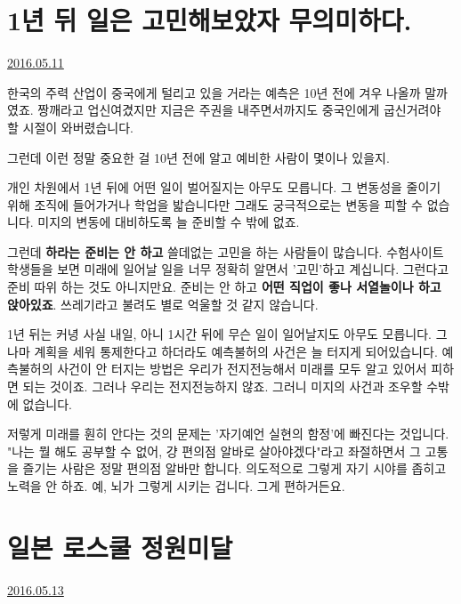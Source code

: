 \section{1년 뒤 일은 고민해보았자 무의미하다.}
\href{https://www.kockoc.com/Apoc/769099}{2016.05.11}

\vspace{5mm}

한국의 주력 산업이 중국에게 털리고 있을 거라는 예측은 10년 전에 겨우 나올까 말까였죠.
짱깨라고 업신여겼지만 지금은 주권을 내주면서까지도 중국인에게 굽신거려야 할 시절이 와버렸습니다.
\vspace{5mm}

그런데 이런 정말 중요한 걸 10년 전에 알고 예비한 사람이 몇이나 있을지.
\vspace{5mm}

개인 차원에서 1년 뒤에 어떤 일이 벌어질지는 아무도 모릅니다.
그 변동성을 줄이기 위해 조직에 들어가거나 학업을 밟습니다만 그래도 궁극적으로는 변동을 피할 수 없습니다.
미지의 변동에 대비하도록 늘 준비할 수 밖에 없죠.
\vspace{5mm}

그런데 \textbf{하라는 준비는 안 하고} 쓸데없는 고민을 하는 사람들이 많습니다.
수험사이트 학생들을 보면 미래에 일어날 일을 너무 정확히 알면서 '고민'하고 계십니다. 그런다고 준비 따위 하는 것도 아니지만요.
준비는 안 하고 \textbf{어떤 직업이 좋나 서열놀이나 하고 앉아있죠}. 쓰레기라고 불려도 별로 억울할 것 같지 않습니다.
\vspace{5mm}

1년 뒤는 커녕 사실 내일, 아니 1시간 뒤에 무슨 일이 일어날지도 아무도 모릅니다.
그나마 계획을 세워 통제한다고 하더라도 예측불허의 사건은 늘 터지게 되어있습니다.
예측불허의 사건이 안 터지는 방법은 우리가 전지전능해서 미래를 모두 알고 있어서 피하면 되는 것이죠.
그러나 우리는 전지전능하지 않죠. 그러니 미지의 사건과 조우할 수밖에 없습니다.
\vspace{5mm}

저렇게 미래를 훤히 안다는 것의 문제는 '자기예언 실현의 함정'에 빠진다는 것입니다.
"나는 뭘 해도 공부할 수 없어, 걍 편의점 알바로 살아야겠다"라고 좌절하면서 그 고통을 즐기는 사람은 정말 편의점 알바만 합니다.
의도적으로 그렇게 자기 시야를 좁히고 노력을 안 하죠. 예, 뇌가 그렇게 시키는 겁니다. 그게 편하거든요.
\vspace{5mm}




\section{일본 로스쿨 정원미달}
\href{https://www.kockoc.com/Apoc/772439}{2016.05.13}

